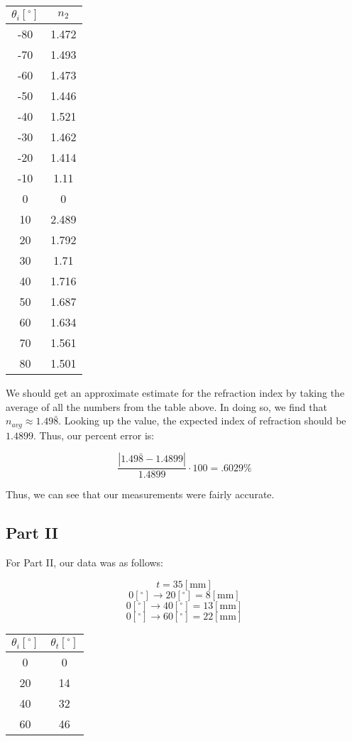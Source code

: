 \documentclass[
	letterpaper, %
	10pt, %
]{CSUniSchoolLabReport}
\begin{document}
\begin{center}
\begin{tabular}[H]{|c|c|}
  \hline
  $\theta_i [^{\circ}]$ & $n_2$\\
  \hline
  -80 & 1.472\\
  \hline
  -70 & 1.493\\
  \hline
  -60 & 1.473\\
  \hline
  -50 & 1.446\\
  \hline
  -40 & 1.521\\
  \hline
  -30 & 1.462\\
  \hline
  -20 & 1.414\\
  \hline
  -10 & 1.11\\
  \hline
  0 & 0\\
  \hline
  10 & 2.489\\
  \hline
  20 & 1.792\\
  \hline
  30 & 1.71\\
  \hline
  40 & 1.716\\
  \hline
  50 & 1.687\\
  \hline
  60 & 1.634\\
  \hline
  70 & 1.561\\
  \hline
  80 & 1.501\\
  \hline
\end{tabular}
\end{center}

We should get an approximate estimate for the refraction index by taking the average of all the numbers from the table above. In doing so, we find that $n_{avg}\approx1.49\bar{8}$. Looking up the value, the expected index of refraction should be $1.4899$. Thus, our percent error is:

$$\frac{|1.49\bar{8}-1.4899|}{1.4899}\cdot100=.6029\%$$

Thus, we can see that our measurements were fairly accurate.

\subsection{Part II}

For Part II, our data was as follows:

$$t=35[\si{\milli\meter}]$$
$$0[^{\circ}]\to20[^{\circ}]=8[\si{\milli\meter}]$$
$$0[^{\circ}]\to40[^{\circ}]=13[\si{\milli\meter}]$$
$$0[^{\circ}]\to60[^{\circ}]=22[\si{\milli\meter}]$$

\begin{center}
  \begin{tabular}[H]{|c|c|}
    \hline
    $\theta_i [^{\circ}]$ & $\theta_t [^{\circ}]$\\
    \hline
    0 & 0\\
    \hline
    20 & 14\\
    \hline
    40 & 32\\
    \hline
    60 & 46\\
    \hline
  \end{tabular}
\end{center}
\end{document}
